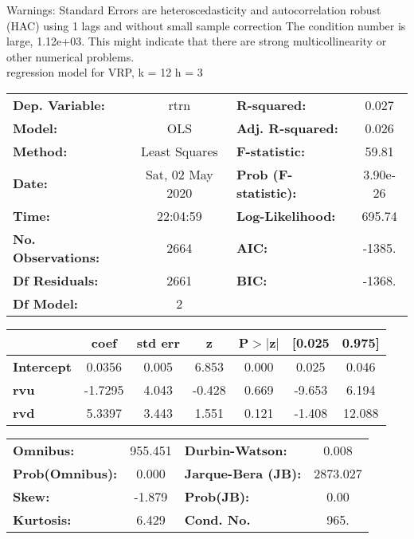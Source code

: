 Warnings: \newline
 [1] Standard Errors are heteroscedasticity and autocorrelation robust (HAC) using 1 lags and without small sample correction \newline
 [2] The condition number is large, 1.12e+03. This might indicate that there are \newline
 strong multicollinearity or other numerical problems.\\ 

regression model for VRP, k = 12 h = 3\begin{center}
\begin{tabular}{lclc}
\toprule
\textbf{Dep. Variable:}    &       rtrn       & \textbf{  R-squared:         } &     0.027   \\
\textbf{Model:}            &       OLS        & \textbf{  Adj. R-squared:    } &     0.026   \\
\textbf{Method:}           &  Least Squares   & \textbf{  F-statistic:       } &     59.81   \\
\textbf{Date:}             & Sat, 02 May 2020 & \textbf{  Prob (F-statistic):} &  3.90e-26   \\
\textbf{Time:}             &     22:04:59     & \textbf{  Log-Likelihood:    } &    695.74   \\
\textbf{No. Observations:} &        2664      & \textbf{  AIC:               } &    -1385.   \\
\textbf{Df Residuals:}     &        2661      & \textbf{  BIC:               } &    -1368.   \\
\textbf{Df Model:}         &           2      & \textbf{                     } &             \\
\bottomrule
\end{tabular}
\begin{tabular}{lcccccc}
                   & \textbf{coef} & \textbf{std err} & \textbf{z} & \textbf{P$> |$z$|$} & \textbf{[0.025} & \textbf{0.975]}  \\
\midrule
\textbf{Intercept} &       0.0356  &        0.005     &     6.853  &         0.000        &        0.025    &        0.046     \\
\textbf{rvu}       &      -1.7295  &        4.043     &    -0.428  &         0.669        &       -9.653    &        6.194     \\
\textbf{rvd}       &       5.3397  &        3.443     &     1.551  &         0.121        &       -1.408    &       12.088     \\
\bottomrule
\end{tabular}
\begin{tabular}{lclc}
\textbf{Omnibus:}       & 955.451 & \textbf{  Durbin-Watson:     } &    0.008  \\
\textbf{Prob(Omnibus):} &   0.000 & \textbf{  Jarque-Bera (JB):  } & 2873.027  \\
\textbf{Skew:}          &  -1.879 & \textbf{  Prob(JB):          } &     0.00  \\
\textbf{Kurtosis:}      &   6.429 & \textbf{  Cond. No.          } &     965.  \\
\bottomrule
\end{tabular}
\end{center}

